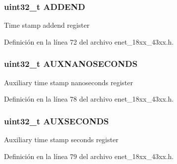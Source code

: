 \subsubsection[{\texorpdfstring{A\+D\+D\+E\+ND}{ADDEND}}]{ uint32\+\_\+t A\+D\+D\+E\+ND}\hypertarget{struct_l_p_c___e_n_e_t___t_ad317892e24185ffaf8cf0dea234ab708}{}\label{struct_l_p_c___e_n_e_t___t_ad317892e24185ffaf8cf0dea234ab708}
Time stamp addend register 

Definición en la línea 72 del archivo enet\+\_\+18xx\+\_\+43xx.\+h.

\subsubsection[{\texorpdfstring{A\+U\+X\+N\+A\+N\+O\+S\+E\+C\+O\+N\+DS}{AUXNANOSECONDS}}]{ uint32\+\_\+t A\+U\+X\+N\+A\+N\+O\+S\+E\+C\+O\+N\+DS}\hypertarget{struct_l_p_c___e_n_e_t___t_ae1d236c58f2f8423d9293f12079b9a78}{}\label{struct_l_p_c___e_n_e_t___t_ae1d236c58f2f8423d9293f12079b9a78}
Auxiliary time stamp nanoseconds register 

Definición en la línea 78 del archivo enet\+\_\+18xx\+\_\+43xx.\+h.

\subsubsection[{\texorpdfstring{A\+U\+X\+S\+E\+C\+O\+N\+DS}{AUXSECONDS}}]{ uint32\+\_\+t A\+U\+X\+S\+E\+C\+O\+N\+DS}\hypertarget{struct_l_p_c___e_n_e_t___t_ad167767881a51644b80b26acf8d31f31}{}\label{struct_l_p_c___e_n_e_t___t_ad167767881a51644b80b26acf8d31f31}
Auxiliary time stamp seconds register 

Definición en la línea 79 del archivo enet\+\_\+18xx\+\_\+43xx.\+h.

